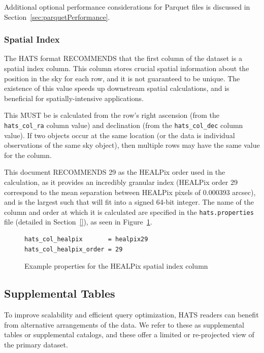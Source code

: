 \documentclass[11pt,a4paper]{ivoa}
\begin{document}
Additional optional performance considerations for Parquet files is discussed in Section~\ref{sec:parquetPerformance}.

\subsubsection{Spatial Index} \label{sec:spatialIndex}

The HATS format RECOMMENDS that the first column of the dataset is a spatial index column.
This column stores crucial spatial information about the position in the sky for each row, and it is not guaranteed to be unique.
The existence of this value speeds up downstream spatial calculations, and is beneficial for spatially-intensive applications.

This MUST be is calculated from the row's right ascension (from the \texttt{hats\_col\_ra} column value) and declination (from the \texttt{hats\_col\_dec} column value).
If two objects occur at the same location (or the data is individual observations of the same sky object), then multiple rows may have the same value for the column.

This document RECOMMENDS 29 as the HEALPix order used in the calculation, as it provides an incredibly granular index (HEALPix order 29 correspond to the mean separation between HEALPix pixels of 0.000393 arcsec), and is the largest such that will fit into a signed 64-bit integer.
The name of the column and order at which it is calculated are specified in the \texttt{hats.properties} file (detailed in Section~\ref{}), as seen in Figure~\ref{fig:healpix29Properties}.

\begin{figure}
\begin{minipage}{\linewidth}
\begin{lstlisting}
hats_col_healpix       = healpix29
hats_col_healpix_order = 29
\end{lstlisting} 
\end{minipage} 
\caption{Example properties for the HEALPix spatial index column}
\label{fig:healpix29Properties}
\end{figure}

\subsection{Supplemental Tables} \label{sec:supplemental}

To improve scalability and efficient query optimization, HATS readers can benefit from alternative arrangements of the data. 
We refer to these as supplemental tables or supplemental catalogs, and these offer a limited or re-projected view of the primary dataset.
\end{document}
